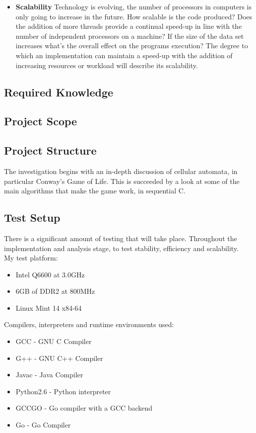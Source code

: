 \documentclass[11pt]{article} %
\begin{document}
\begin{itemize}
\item {\bf Scalability} Technology is evolving, the number of processors in computers is only going to increase in the future. How scalable is the code produced? Does the addition of more threads provide a continual speed-up in line with the number of independent processors on a machine? If the size of the data set increases what's the overall effect on the programs execution? The degree to which an implementation can maintain a speed-up with the addition of increasing resources or workload will describe its scalability.
\end{itemize}
\subsection{Required Knowledge}
\subsection{Project Scope}
\subsection{Project Structure}
The investigation begins with an in-depth discussion of cellular automata, in particular Conway's Game of Life. This is succeeded by a look at some of the main algorithms that make the game work, in sequential C. 
\subsection{Test Setup}
There is a significant amount of testing that will take place. Throughout the implementation and analysis stage, to test stability, efficiency and scalability.
\smallskip
\\My test platform:
\begin{itemize}
\item Intel Q6600 at 3.0GHz
\item 6GB of DDR2 at 800MHz
\item Linux Mint 14 x84-64
\end{itemize} 
Compilers, interpreters and runtime environments used:
\begin{itemize}
\item GCC - GNU C Compiler
\item G++ - GNU C++ Compiler
\item Javac - Java Compiler 
\item Python2.6 - Python interpreter
\item GCCGO - Go compiler with a GCC backend
\item Go - Go Compiler
\end{itemize}
\end{document}
